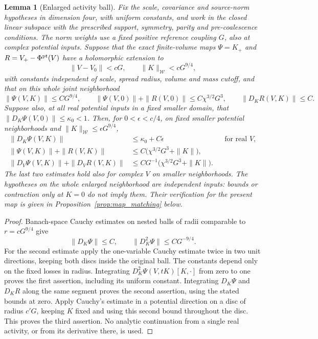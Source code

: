 \documentclass[11pt]{article}
\newtheorem{lemma}[proposition]{Lemma}
\begin{document}
\begin{lemma}[Enlarged activity ball]\label{lem:enlarged}
Fix the scale, covariance and source-norm hypotheses in dimension
four, with uniform constants, and work in the closed linear subspace
with the prescribed support, symmetry, parity and pre-coalescence
conditions.  The norm weights use a fixed positive reference coupling
\(G\), also at complex potential inputs.  Suppose that the exact
finite-volume maps \(\Psi=K_+\) and
\(R=V_+-\Phi^{\rm pt}(V)\) have a holomorphic extension to
\[
 \|V-V_0\|<cG,\qquad \|K\|_{\mathcal W}<cG^{9/4},
\]
with constants independent of scale, spread radius, volume and mass
cutoff, and that on this \emph{whole} joint neighborhood
\[
 \|\Psi(V,K)\|\le C G^{9/4},\qquad
 \|\Psi(V,0)\|+\|R(V,0)\|\le C\chi^{3/2}G^3,
 \qquad \|D_KR(V,K)\|\le C .
\]
Suppose also, at all real potential inputs in a fixed smaller domain,
that \(\|D_K\Psi(V,0)\|\le\kappa_0<1\).  Then, for
\(0<\epsilon<c/4\), on fixed smaller potential neighborhoods and
\(\|K\|_{\mathcal W}\le\epsilon G^{9/4}\),
\begin{align*}
 \|D_K\Psi(V,K)\|&\le\kappa_0+C\epsilon
                  &&\text{for real }V,\\
 \|\Psi(V,K)\|+\|R(V,K)\|
       &\le C\bigl(\chi^{3/2}G^3+\|K\|\bigr),\\
 \|D_V\Psi(V,K)\|+\|D_VR(V,K)\|
       &\le C G^{-1}\bigl(\chi^{3/2}G^3+\|K\|\bigr).
\end{align*}
The last two estimates hold also for complex \(V\) on smaller
neighborhoods.  The hypotheses on the whole enlarged neighborhood
are independent inputs: bounds or contraction only at \(K=0\)
do not imply them.  Their verification for the present map is given
in Proposition~\ref{prop:map_matching} below.
\end{lemma}

\begin{proof}
Banach-space Cauchy estimates on nested balls of radii comparable
to \(r=cG^{9/4}\) give
\[
 \|D_K\Psi\|\le C,
 \qquad \|D_K^2\Psi\|\le C G^{-9/4}.
\]
For the second estimate apply the one-variable Cauchy estimate twice
in two unit directions, keeping both discs inside the original ball.
The constants depend only on the fixed losses in radius.  Integrating
\(D_K^2\Psi(V,tK)[K,\cdot]\) from zero to one proves the first
assertion, including its uniform constant.  Integrating \(D_K\Psi\)
and \(D_KR\) along the same segment proves the second assertion,
using the stated bounds at zero.  Apply Cauchy's estimate in a
potential direction on a disc of radius \(c'G\), keeping \(K\)
fixed and using this second bound throughout the disc.  This proves
the third assertion.  No analytic continuation from a single real
activity, or from its derivative there, is used.
\end{proof}
\end{document}
